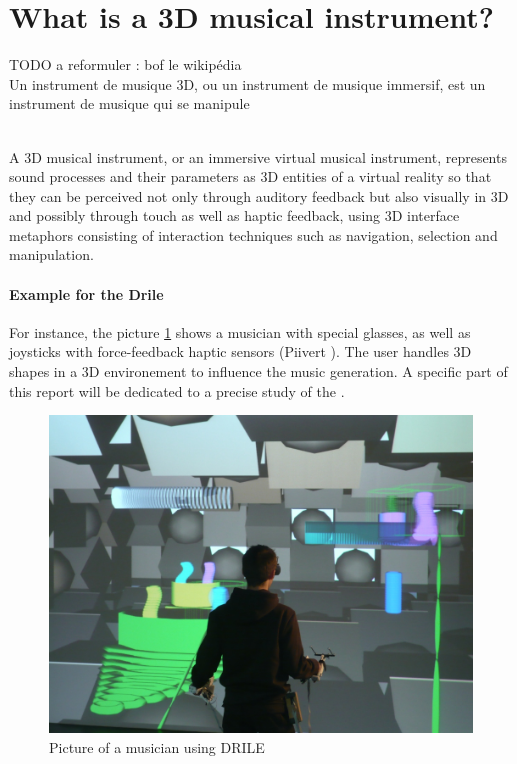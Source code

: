 \newpage
\section{What is a 3D musical instrument?}
{\LARGE{TODO a reformuler : bof le wikipédia}}\\
Un instrument de musique 3D, ou un instrument de musique immersif, est un instrument de musique qui se manipule 

\\

A 3D musical instrument, or an immersive virtual musical instrument, represents sound processes and their parameters as 3D entities of a virtual reality so that they can be perceived not only through auditory feedback but also visually in 3D and possibly through touch as well as haptic feedback, using 3D interface metaphors consisting of interaction techniques such as navigation, selection and manipulation.

\paragraph{Example for the Drile}
For instance, the picture \ref{drile} shows a musician with special glasses, as well as joysticks with force-feedback haptic sensors (Piivert \cite{berthaut2010piivert}). 
The user handles 3D shapes in a 3D environement to influence the music generation. A specific part of this report will be dedicated to a precise study of the .

\begin{figure}[t]
\centering
\includegraphics[scale=0.3]{image/drile.jpg}
\caption{Picture of a musician using DRILE}
\label{drile}
\end{figure}

